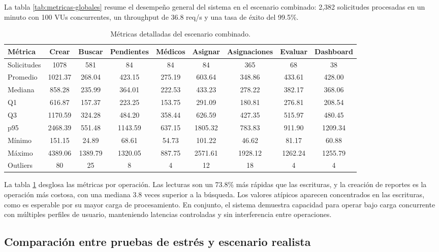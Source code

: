 La tabla \ref{tab:metricas-globales} resume el desempeño general del sistema en el escenario combinado: 2,382 solicitudes procesadas en un minuto con 100 VUs concurrentes, un throughput de 36.8 req/s y una tasa de éxito del 99.5\%. 

\begin{table}[H]
\centering
\caption{Métricas detalladas del escenario combinado.}
\label{tab:metricas-endpoints}
\footnotesize
\begin{tabular}{lcccccccc}
\hline
\textbf{Métrica} & Crear & Buscar & Pendientes & Médicos & Asignar & Asignaciones & Evaluar & Dashboard \\
\hline
Solicitudes & 1078 & 581 & 84 & 84 & 84 & 365 & 68 & 38 \\
Promedio & 1021.37 & 268.04 & 423.15 & 275.19 & 603.64 & 348.86 & 433.61 & 428.00 \\
Mediana & 858.28 & 235.99 & 364.01 & 222.53 & 433.23 & 278.22 & 382.17 & 368.06 \\
Q1 & 616.87 & 157.37 & 223.25 & 153.75 & 291.09 & 180.81 & 276.81 & 208.54 \\
Q3 & 1170.59 & 324.28 & 484.20 & 358.44 & 626.59 & 427.35 & 515.97 & 480.45 \\
p95 & 2468.39 & 551.48 & 1143.59 & 637.15 & 1805.32 & 783.83 & 911.90 & 1209.34 \\
Mínimo & 151.15 & 24.89 & 68.61 & 54.73 & 101.22 & 46.62 & 81.17 & 60.88 \\
Máximo & 4389.06 & 1389.79 & 1320.05 & 887.75 & 2571.61 & 1928.12 & 1262.24 & 1255.79 \\
Outliers & 80 & 25 & 8 & 4 & 12 & 18 & 4 & 4 \\
\hline
\end{tabular}
\end{table}


La tabla \ref{tab:metricas-endpoints} desglosa las métricas por operación. Las lecturas son un 73.8\% más rápidas que las escrituras, y la creación de reportes es la operación más costosa, con una mediana 3.8 veces superior a la búsqueda. 
Los valores atípicos aparecen concentrados en las escrituras, como es esperable por su mayor carga de procesamiento. 
En conjunto, el sistema demuestra capacidad para operar bajo carga concurrente con múltiples perfiles de usuario, manteniendo latencias controladas y sin interferencia entre operaciones.

\subsection{Comparación entre pruebas de estrés y escenario realista}

